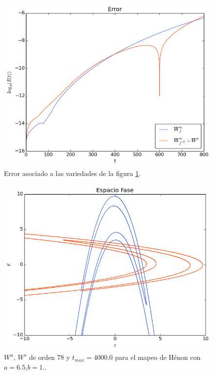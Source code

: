 \begin{figure}[H]
\centering
\includegraphics[scale=0.6]{ErrorHenon2}
\caption{Error asociado a las variedades de la figura \ref{Henon2}.}
\label{Henon2}
\end{figure}


\begin{figure}[H]
\centering
\includegraphics[scale=0.6]{henon3}
\caption{$W^{u}$, $W^{s}$ de orden $78$ y $t_{max}=4000.0$ para el mapeo de Hénon con $a=6.5$,$b=1.$.}
\label{Henon3}
\end{figure}

